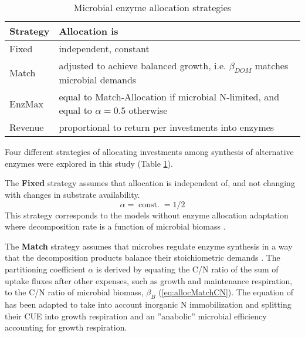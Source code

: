 \begin{table}[t]
\caption{Microbial enzyme allocation strategies \label{tab:AllocStrategies}}
\vskip4mm
\centering
\begin{tabular}{lp{6.5cm}}
\hline
Strategy &  Allocation is \\
\hline
Fixed & independent, constant \\
Match & adjusted to achieve balanced growth, i.e. $\beta_{DOM}$ matches
microbial demands  \\
EnzMax & equal to Match-Allocation if microbial N-limited, and
equal to $\alpha=0.5$ otherwise
\\
Revenue & proportional to return per investments into enzymes \\
\hline
\end{tabular}
\end{table}

Four different strategies of
allocating investments among synthesis of alternative enzymes were explored in this study (Table
\ref{tab:AllocStrategies}).

The \textbf{Fixed} strategy assumes that allocation is independent of,
and not changing with changes in substrate availability.
\begin{equation} 
\label{eq:allocFixed}
\alpha = \operatorname{const.} = 1/2
\end{equation}
This strategy corresponds to the models without enzyme allocation adaptation
where decomposition rate is a function of microbial biomass \citep{Wutzler08}.
 
The \textbf{Match} strategy assumes that microbes regulate enzyme synthesis in a
way that the decomposition products balance their stoichiometric demands
\citep{Moorhead12}. The partitioning coefficient $\alpha$ is derived by equating
the C/N ratio of the sum of uptake fluxes after other expenses, such as growth
and maintenance respiration, to the C/N ratio of microbial biomass, $\beta_B$
(\ref{eq:allocMatchCN}). The equation of \citep{Moorhead12} has been adapted to
take into account inorganic N immobilization and splitting their CUE into growth
respiration and an ''anabolic'' microbial efficiency accounting for growth
respiration.

